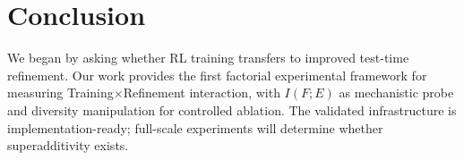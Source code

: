 \section{Conclusion}
\label{sec:conclusion}

We began by asking whether RL training transfers to improved test-time refinement. Our work provides the first factorial experimental framework for measuring Training$\times$Refinement interaction, with $I(F;E)$ as mechanistic probe and diversity manipulation for controlled ablation. The validated infrastructure is implementation-ready; full-scale experiments will determine whether superadditivity exists.
